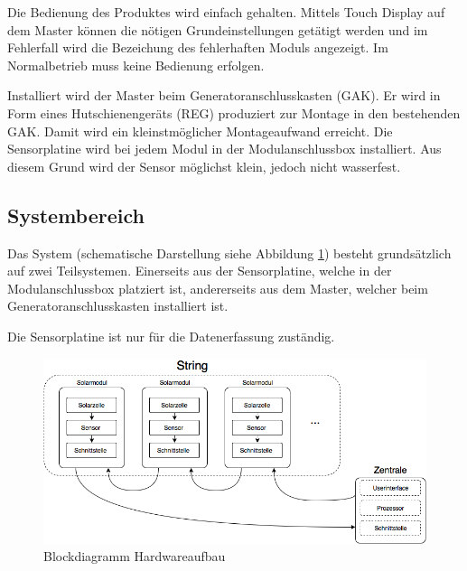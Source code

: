Die Bedienung des  Produktes wird einfach gehalten. Mittels  Touch Display auf
dem  Master k\"onnen  die n\"otigen  Grundeinstellungen get\"atigt  werden und
im  Fehlerfall  wird  die  Bezeichung des  fehlerhaften  Moduls  angezeigt. Im
Normalbetrieb muss keine Bedienung erfolgen.

Installiert wird  der Master  beim Generatoranschlusskasten (GAK). Er  wird in
Form eines Hutschienenger\"ats (REG) produziert zur Montage in den bestehenden
GAK. Damit   wird  ein   kleinstm\"oglicher   Montageaufwand  erreicht.    Die
Sensorplatine wird  bei jedem Modul in  der Modulanschlussbox installiert. Aus
diesem Grund wird der Sensor m\"oglichst klein, jedoch nicht wasserfest.




\clearpage
\subsection{Systembereich}

Das      System      (schematische       Darstellung      siehe      Abbildung
\ref{fig:blockdiag:hardware})     besteht     grunds\"atzlich     auf     zwei
Teilsystemen. Einerseits    aus    der    Sensorplatine,   welche    in    der
Modulanschlussbox  platziert ist,  andererseits aus  dem Master,  welcher beim
Generatoranschlusskasten installiert ist.

Die Sensorplatine ist nur f\"ur die Datenerfassung zust\"andig.

\begin{figure}[h!]
    \centering
    \includegraphics[width=.9\textwidth]{images/blockdiag.png}
    \caption{Blockdiagramm Hardwareaufbau}
    \label{fig:blockdiag:hardware}
\end{figure}


